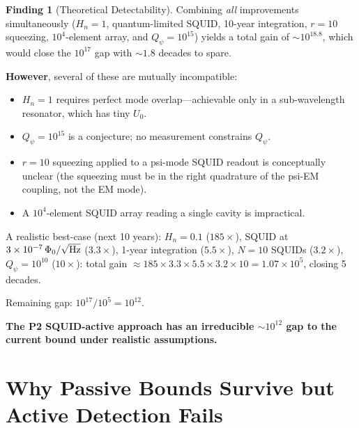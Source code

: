 \documentclass[11pt,twocolumn]{article}
\newcommand{\ee}[1]{\times 10^{#1}}
\newcommand{\Qpsi}{Q_\psi}
\newcommand{\Heff}{H_n}
\newcommand{\Ucav}{U_0}
\theoremstyle{definition}
\newtheorem{finding}[theorem]{Finding}
\theoremstyle{remark}
\begin{document}
\begin{finding}[Theoretical Detectability]
\label{find:detectability}
Combining \emph{all} improvements simultaneously
($\Heff = 1$, quantum-limited SQUID, 10-year integration, $r = 10$
squeezing, $10^4$-element array, and $\Qpsi = 10^{15}$) yields a total
gain of $\sim 10^{18.8}$, which would close the $10^{17}$ gap
with $\sim 1.8$ decades to spare.

\textbf{However}, several of these are mutually incompatible:
\begin{itemize}[nosep]
\item $\Heff = 1$ requires perfect mode overlap---achievable only in a
  sub-wavelength resonator, which has tiny $\Ucav$.
\item $\Qpsi = 10^{15}$ is a conjecture; no measurement constrains $\Qpsi$.
\item $r = 10$ squeezing applied to a psi-mode SQUID readout is
  conceptually unclear (the squeezing must be in the right quadrature
  of the psi-EM coupling, not the EM mode).
\item A $10^4$-element SQUID array reading a single cavity is impractical.
\end{itemize}

A realistic best-case (next 10 years):
$\Heff = 0.1$ ($185\times$), SQUID at $3\ee{-7}\,\Phi_0/\sqrt{\rm Hz}$
($3.3\times$), 1-year integration ($5.5\times$), $N = 10$ SQUIDs
($3.2\times$), $\Qpsi = 10^{10}$ ($10\times$):
total gain $\approx 185\times 3.3\times 5.5\times 3.2\times 10
= 1.07\ee{5}$, closing 5 decades.

Remaining gap: $10^{17}/10^5 = 10^{12}$.

\textbf{The P2 SQUID-active approach has an irreducible $\sim 10^{12}$
gap to the current bound under realistic assumptions.}
\end{finding}

\section{Why Passive Bounds Survive but Active Detection Fails}
\label{sec:passive_vs_active}
\end{document}
